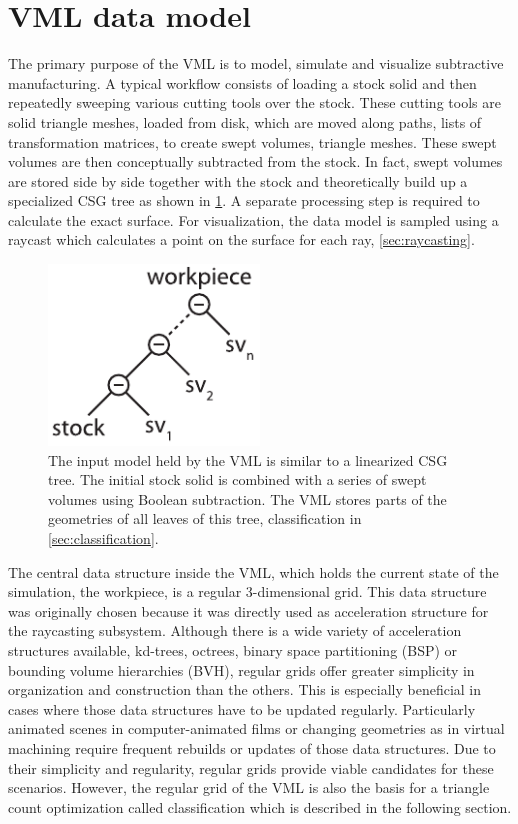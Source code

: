 \section{VML data model}
\label{sec:vml_data_model}

The primary purpose of the VML is to model, simulate and visualize subtractive manufacturing.
A typical workflow consists of loading a stock solid and then repeatedly sweeping various cutting tools over the stock.
These cutting tools are solid triangle meshes, loaded from disk, which are moved along paths, \ie lists of transformation matrices, to create swept volumes, \ie triangle meshes.
These swept volumes are then conceptually subtracted from the stock.
In fact, swept volumes are stored side by side together with the stock and theoretically build up a specialized CSG tree as shown in \cref{fig:vml_csg}.
A separate processing step is required to calculate the exact surface.
For visualization, the data model is sampled using a raycast which calculates a point on the surface for each ray, \cf \cref{sec:raycasting}.

\begin{figure}[h]
	\centering
	\includegraphics[width=0.5\textwidth]{images/vml_csg}
	\caption[VML CSG representation]{
		The input model held by the VML is similar to a linearized CSG tree.
		The initial stock solid is combined with a series of swept volumes using Boolean subtraction.
		The VML stores parts of the geometries of all leaves of this tree, \cf classification in \cref{sec:classification}.
	}
	\label{fig:vml_csg}
\end{figure}


The central data structure inside the VML, which holds the current state of the simulation, \ie the workpiece, is a regular 3-dimensional grid.
This data structure was originally chosen because it was directly used as acceleration structure for the raycasting subsystem.
Although there is a wide variety of acceleration structures available, \eg kd-trees, octrees, binary space partitioning (BSP) or bounding volume hierarchies (BVH), regular grids offer greater simplicity in organization and construction than the others.
This is especially beneficial in cases where those data structures have to be updated regularly.
Particularly animated scenes in computer-animated films or changing geometries as in virtual machining require frequent rebuilds or updates of those data structures.
Due to their simplicity and regularity, regular grids provide viable candidates for these scenarios.
However, the regular grid of the VML is also the basis for a triangle count optimization called classification which is described in the following section.


